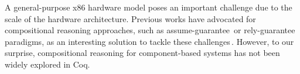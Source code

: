 A general-purpose x86 hardware model poses an important challenge due
to the scale of the hardware architecture.
%
Previous works have advocated for compositional reasoning approaches, such as
assume-guarantee\,\cite{pnueli1985ag} or
rely-guarantee\,\cite{jones1983tentative} paradigms, as an interesting solution
to tackle these challenges\,\cite{garg2010compositional,heyman2012securemodel}.
%
However, to our surprise, compositional reasoning for component-based systems
has not been widely explored in Coq. 
